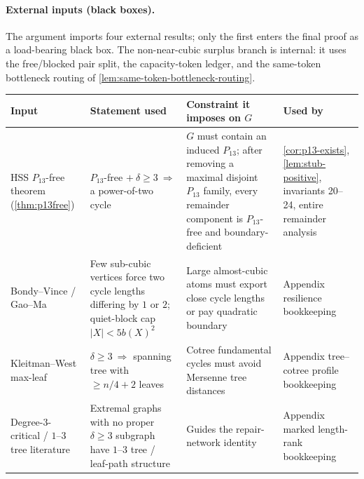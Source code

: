 \documentclass[11pt]{article}
\begin{document}
\paragraph{External inputs (black boxes).}
The argument imports four external results; only the first enters the final
proof as a load-bearing black box.  The non-near-cubic surplus branch is
internal: it uses the
free/blocked pair split, the capacity-token ledger, and the same-token
bottleneck routing of \cref{lem:same-token-bottleneck-routing}.

{\small
\begin{longtable}{L{0.17\textwidth} L{0.28\textwidth} L{0.27\textwidth} L{0.20\textwidth}}
\toprule
\textbf{Input} & \textbf{Statement used} & \textbf{Constraint it imposes on $G$} & \textbf{Used by} \\
\midrule
\endhead
HSS $P_{13}$-free theorem (\cref{thm:p13free}) & $P_{13}$-free $+\ \delta\ge3\ \Rightarrow$ a power-of-two cycle & $G$ must contain an induced $P_{13}$; after removing a maximal disjoint $P_{13}$ family, every remainder component is $P_{13}$-free and boundary-deficient & \cref{cor:p13-exists}, \cref{lem:stub-positive}, invariants 20--24, entire remainder analysis \\
Bondy--Vince / Gao--Ma & Few sub-cubic vertices force two cycle lengths differing by $1$ or $2$; quiet-block cap $|X|<5b(X)^2$ & Large almost-cubic atoms must export close cycle lengths or pay quadratic boundary & Appendix resilience bookkeeping \\
Kleitman--West max-leaf & $\delta\ge3\ \Rightarrow$ spanning tree with $\ge n/4+2$ leaves & Cotree fundamental cycles must avoid Mersenne tree distances & Appendix tree--cotree profile bookkeeping \\
Degree-3-critical / $1$--$3$ tree literature & Extremal graphs with no proper $\delta\ge3$ subgraph have $1$--$3$ tree / leaf-path structure & Guides the repair-network identity & Appendix marked length-rank bookkeeping \\
\bottomrule
\end{longtable}
}
\end{document}
